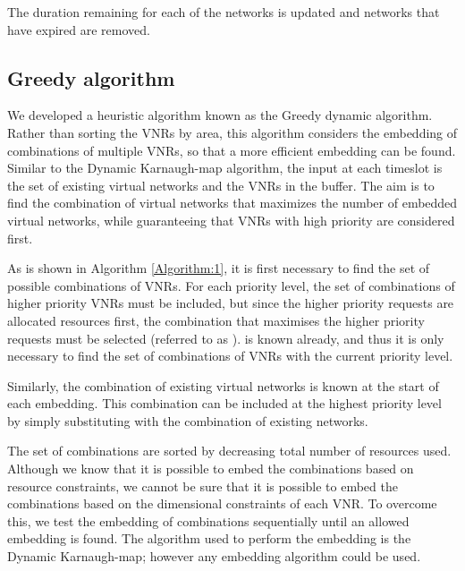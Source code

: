 \documentclass[conference]{IEEEtran}
\begin{document}
The duration remaining for each of the networks is updated and networks that have expired are removed.




\subsection{Greedy algorithm}

We developed a heuristic algorithm known as the Greedy dynamic algorithm. Rather than sorting the VNRs by area, this algorithm considers the embedding of combinations of multiple VNRs, so that a more efficient embedding can be found. Similar to the Dynamic Karnaugh-map algorithm, the input at each timeslot is the set of existing virtual networks and the VNRs in the buffer. The aim is to find the combination of virtual networks that maximizes the number of embedded virtual networks, while guaranteeing that VNRs with high priority are considered first.

As is shown in Algorithm \ref{Algorithm:1}, it is first necessary to find the set of possible combinations of VNRs. For each priority level, the set of combinations of higher priority VNRs must be included, but since the higher priority requests are allocated resources first, the combination that maximises the higher priority requests must be selected (referred to as ).  is known already, and thus it is only necessary to find the set of combinations of VNRs with the current priority level.

Similarly, the combination of existing virtual networks is known at the start of each embedding. This combination can be included at the highest priority level by simply substituting  with the  combination of existing networks.



The set of combinations are sorted by decreasing total number of resources used. Although we know that it is possible to embed the combinations based on resource constraints, we cannot be sure that it is possible to embed the combinations based on the dimensional constraints of each VNR. To overcome this, we test the embedding of combinations sequentially until an allowed embedding is found. The algorithm used to perform the embedding is the Dynamic Karnaugh-map; however any embedding algorithm could be used.



\renewcommand{\algorithmicrequire}{\textbf{Input:}}
\renewcommand{\algorithmicensure}{\textbf{Output:}}
\end{document}

